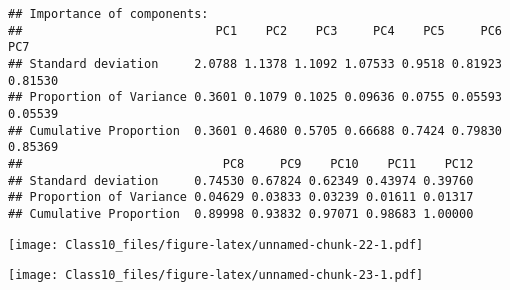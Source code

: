 \documentclass[
]{article}
\newenvironment{Shaded}{\begin{snugshade}}{\end{snugshade}}
\newcommand{\AttributeTok}[1]{\textcolor[rgb]{0.77,0.63,0.00}{#1}}
\newcommand{\CommentTok}[1]{\textcolor[rgb]{0.56,0.35,0.01}{\textit{#1}}}
\newcommand{\DecValTok}[1]{\textcolor[rgb]{0.00,0.00,0.81}{#1}}
\newcommand{\FunctionTok}[1]{\textcolor[rgb]{0.00,0.00,0.00}{#1}}
\newcommand{\NormalTok}[1]{#1}
\newcommand{\OtherTok}[1]{\textcolor[rgb]{0.56,0.35,0.01}{#1}}
\newcommand{\SpecialCharTok}[1]{\textcolor[rgb]{0.00,0.00,0.00}{#1}}
\newcommand{\StringTok}[1]{\textcolor[rgb]{0.31,0.60,0.02}{#1}}
\begin{document}
\begin{verbatim}
## Importance of components:
##                           PC1    PC2    PC3     PC4    PC5     PC6     PC7
## Standard deviation     2.0788 1.1378 1.1092 1.07533 0.9518 0.81923 0.81530
## Proportion of Variance 0.3601 0.1079 0.1025 0.09636 0.0755 0.05593 0.05539
## Cumulative Proportion  0.3601 0.4680 0.5705 0.66688 0.7424 0.79830 0.85369
##                            PC8     PC9    PC10    PC11    PC12
## Standard deviation     0.74530 0.67824 0.62349 0.43974 0.39760
## Proportion of Variance 0.04629 0.03833 0.03239 0.01611 0.01317
## Cumulative Proportion  0.89998 0.93832 0.97071 0.98683 1.00000
\end{verbatim}

\begin{Shaded}
\end{Shaded}

\texttt{[image: Class10\_files/figure-latex/unnamed-chunk-22-1.pdf]}

\begin{Shaded}
\end{Shaded}

\texttt{[image: Class10\_files/figure-latex/unnamed-chunk-23-1.pdf]}

\begin{Shaded}
\end{Shaded}
\end{document}

